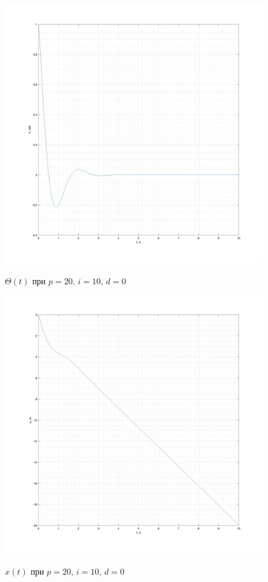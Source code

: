 \documentclass[a5paper, 10pt]{article}
\theoremstyle{definition}
\theoremstyle{plain}
\theoremstyle{remark}
\begin{document}
\begin{figure}[!h]
		{\includegraphics[width=1\linewidth]{"./graphics/x_20_10_0.jpg"}}
	           \caption{$\Theta (t)$ при $p = 20, \, i = 10, \, d = 0$}
\end{figure}
\begin{figure}[!h]
		{\includegraphics[width=1\linewidth]{"./graphics/tet_20_10_0.jpg"}}
	           \caption{$x(t)$  при $p = 20, \, i = 10, \, d = 0$}
\end{figure}
\end{document}
